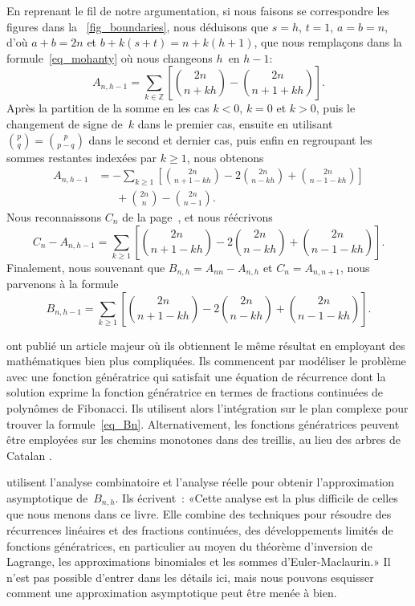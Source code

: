 En reprenant le fil de notre argumentation, si nous faisons se
correspondre les figures dans la \fig~\ref{fig_boundaries}, nous
déduisons que \(s=h\), \(t=1\), \(a=b=n\), d'où \(a+b=2n\) et
\(b+k(s+t)=n+k(h+1)\), que nous remplaçons dans la
formule~\eqref{eq_mohanty} où nous changeons \(h\)~en \(h-1\):
\begin{equation*}
A_{n,h-1} = \sum_{k \in \mathbb{Z}}\left[\binom{2n}{n+kh} -
           \binom{2n}{n+1+kh}\right].
\end{equation*}
Après la partition de la somme en les cas \(k<0\), \(k=0\) et \(k>0\),
puis le changement de signe de~\(k\) dans le premier cas, ensuite en
utilisant \(\binom{p}{q} = \binom{p}{p-q}\) dans le second et dernier
cas, puis enfin en regroupant les sommes restantes indexées par \(k
\geqslant 1\), nous obtenons
\begin{align*}
A_{n,h-1}
  &= - \sum_{k \geqslant 1}\left[\binom{2n}{n+1-kh} -
    2\binom{2n}{n-kh} + \binom{2n}{n-1-kh}\right]\\
  &\phantom{=}\; + \binom{2n}{n} - \binom{2n}{n-1}.
\end{align*}
Nous reconnaissons \(C_n\) de la page~\pageref{eq_Ann}, et nous
réécrivons
\begin{equation*}
C_n - A_{n,h-1}
  = \sum_{k \geqslant 1}\left[\binom{2n}{n+1-kh} -
    2\binom{2n}{n-kh} + \binom{2n}{n-1-kh}\right].
\end{equation*}
Finalement, nous souvenant que \(B_{n,h} = A_{nn} - A_{n,h}\) et \(C_n =
A_{n,n+1}\), nous parvenons à la formule
\begin{equation}
B_{n,h-1} = \sum_{k \geqslant 1}
            \left[\binom{2n}{n+1-kh} - 2\binom{2n}{n-kh}
            + \binom{2n}{n-1-kh}\right].
\label{eq_Bn}
\end{equation}

\citet*{KnuthdeBruijnRice_1972} ont publié un article majeur où ils
obtiennent le même résultat en employant des mathématiques bien plus
compliquées. Ils commencent par modéliser le problème avec une
fonction génératrice \citep{Wilf_1990} qui satisfait une équation de
récurrence dont la solution exprime la fonction génératrice en termes
de fractions continuées de polynômes de Fibonacci. Ils utilisent alors
l'intégration sur le plan complexe pour trouver la
formule~\eqref{eq_Bn}. Alternativement, les fonctions génératrices
peuvent être employées sur les chemins monotones dans des treillis, au
lieu des arbres de Catalan \citep[page~64]{Kemp_1984}
\citep{FlajoletNebelProdinger_2006}.

\citet*{SedgewickFlajolet_1996} \citep{FlajoletSedgewick_2009} utilisent l'analyse combinatoire et l'analyse réelle pour obtenir l'approximation asymptotique de~\(B_{n,h}\). Ils écrivent~\cite[p.~260]{SedgewickFlajolet_1996}: «Cette analyse est la plus difficile de celles que nous menons dans ce livre. Elle combine des techniques pour résoudre des récurrences linéaires et des fractions continuées, des développements limités de fonctions génératrices, en particulier au moyen du théorème d'inversion de Lagrange, les approximations binomiales et les sommes d'Euler\--Maclaurin.» Il n'est pas possible d'entrer dans les détails ici, mais nous pouvons esquisser comment une approximation asymptotique peut être menée à bien.

